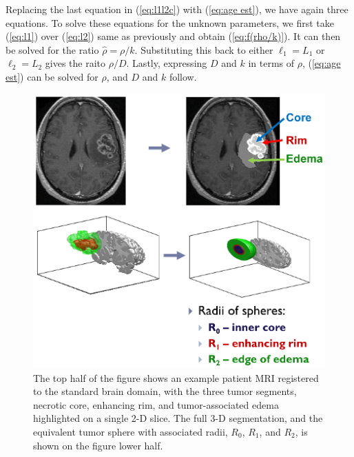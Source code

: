 \documentclass{aims}
\numberwithin{equation}{section}
\begin{document}
Replacing the last equation in (\ref{eq:l1l2c})
with (\ref{eq:age est}), we have again three equations. To solve these equations for the unknown parameters, we first take 
(\ref{eq:l1}) over (\ref{eq:l2}) same as previously and obtain (\ref{eq:f(rho/k)}). It can then be solved for the ratio $\hat{\rho}=\rho/k$. Substituting this back to either $\ell_1=L_1$ or $\ell_2=L_2$ gives the raito $\rho/D$. Lastly, expressing $D$ and $k$ in terms of $\rho$, (\ref{eq:age est}) can be solved for $\rho$, and $D$ and $k$ follow.

\begin{figure}
\begin{center}
\includegraphics[scale=0.81]{plots/radii_process.eps}\caption{\label{fig:radii_process} The top half of the figure shows an example patient MRI registered to the standard brain domain, with the three tumor segments, necrotic core, enhancing rim, and tumor-associated edema highlighted on a single 2-D slice.  The full 3-D segmentation, and the equivalent tumor sphere with associated radii, $R_0$, $R_1$, and $R_2$, is shown on the figure lower half.}
\end{center}
\end{figure}
\end{document}
